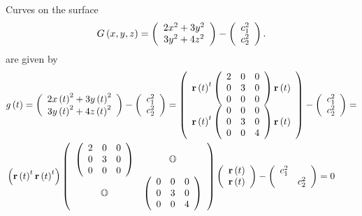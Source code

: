 \documentclass[aps,preprint]{revtex4}%
\begin{document}
Curves on the surface
\begin{equation}
G\left(  x,y,z\right)  =\left(
\begin{array}
[c]{c}%
2x^{2}+3y^{2}\\
3y^{2}+4z^{2}%
\end{array}
\right)  -\left(
\begin{array}
[c]{c}%
c_{1}^{2}\\
c_{2}^{2}%
\end{array}
\right)  .
\end{equation}
are given by
\begin{align}
&  g\left(  t\right)  =\left(
\begin{array}
[c]{c}%
2x\left(  t\right)  ^{2}+3y\left(  t\right)  ^{2}\\
3y\left(  t\right)  ^{2}+4z\left(  t\right)  ^{2}%
\end{array}
\right)  -\left(
\begin{array}
[c]{c}%
c_{1}^{2}\\
c_{2}^{2}%
\end{array}
\right)  =\left(
\begin{array}
[c]{c}%
\mathbf{r}\left(  t\right)  ^{t}\left(
\begin{array}
[c]{ccc}%
2 & 0 & 0\\
0 & 3 & 0\\
0 & 0 & 0
\end{array}
\right)  \mathbf{r}\left(  t\right) \\
\mathbf{r}\left(  t\right)  ^{t}\left(
\begin{array}
[c]{ccc}%
0 & 0 & 0\\
0 & 3 & 0\\
0 & 0 & 4
\end{array}
\right)  \mathbf{r}\left(  t\right)
\end{array}
\right)  -\left(
\begin{array}
[c]{c}%
c_{1}^{2}\\
c_{2}^{2}%
\end{array}
\right)  =\\
&  \left(  \mathbf{r}\left(  t\right)  ^{t}\mathbf{r}\left(  t\right)
^{t}\right)  \left(
\begin{array}
[c]{cc}%
\left(
\begin{array}
[c]{ccc}%
2 & 0 & 0\\
0 & 3 & 0\\
0 & 0 & 0
\end{array}
\right)  & \mathbb{O}\\
\mathbb{O} & \left(
\begin{array}
[c]{ccc}%
0 & 0 & 0\\
0 & 3 & 0\\
0 & 0 & 4
\end{array}
\right)
\end{array}
\right)  \left(
\begin{array}
[c]{c}%
\mathbf{r}\left(  t\right) \\
\mathbf{r}\left(  t\right)
\end{array}
\right)  -\left(
\begin{array}
[c]{cc}%
c_{1}^{2} & \\
& c_{2}^{2}%
\end{array}
\right)  =0
\end{align}
\end{document}
